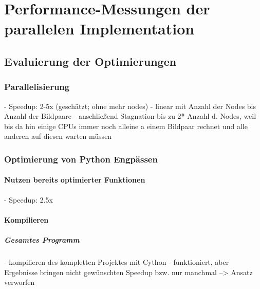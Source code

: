 \chapter{Performance-Messungen der parallelen Implementation}

\section{Evaluierung der Optimierungen}

\subsection{Parallelisierung}

\begin{correctmore}
	- Speedup: 2-5x (geschätzt; ohne mehr nodes)
	- linear mit Anzahl der Nodes bis Anzahl der Bildpaare
	- anschließend Stagnation bis zu 2* Anzahl d. Nodes, weil bis da hin einige CPUs immer noch alleine a einem Bildpaar rechnet und alle anderen auf diesen warten müssen
\end{correctmore}

\subsection{Optimierung von Python Engpässen}

\subsubsection{Nutzen bereits optimierter Funktionen}

\begin{correctmore}
	- Speedup: 2.5x
\end{correctmore}

\subsubsection{Kompilieren}

\paragraph{Gesamtes Programm}

\begin{correctmore}
	- kompilieren des kompletten Projektes mit Cython
	- funktioniert, aber Ergebnisse bringen nicht gewünschten Speedup bzw. nur manchmal
	--> Ansatz verworfen
\end{correctmore}

